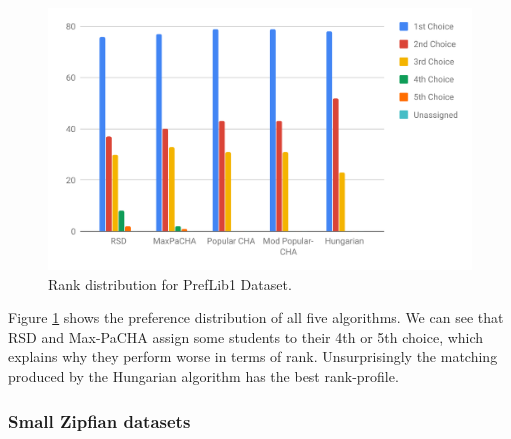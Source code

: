 \begin{figure}[h!]
  \centering
    \includegraphics[width=0.9\linewidth]{assets/plots/preflib2-ranks.pdf}    
    \caption{Rank distribution for PrefLib1 Dataset.}
    \label{fig:preflib2-rank-distribution}
\end{figure}

Figure \ref{fig:preflib2-rank-distribution} shows the preference distribution of all five algorithms. We can see that RSD and Max-PaCHA assign some students to their 4th or 5th choice, which explains why they perform worse in terms of rank. Unsurprisingly the matching produced by the Hungarian algorithm has the best rank-profile.

\subsubsection{Small Zipfian datasets}

\begin{table}[h!]
  \centering
  \caption{Average results for small Zipfian dataset with 50 runs}
  \label{tab:results-zipfian-small}
\end{table}

